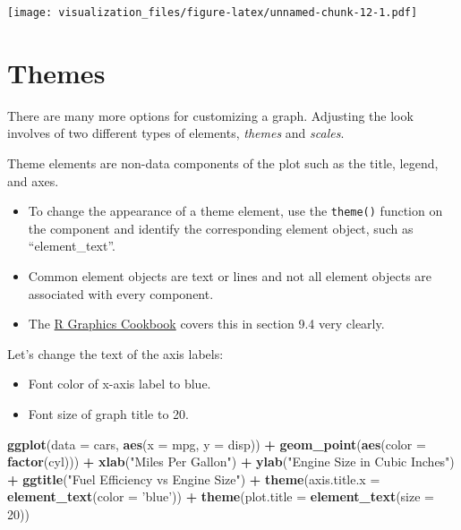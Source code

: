 \documentclass[oneside]{memoir}
\newenvironment{Shaded}{\begin{snugshade}}{\end{snugshade}}
\newcommand{\KeywordTok}[1]{\textcolor[rgb]{0.13,0.29,0.53}{\textbf{#1}}}
\newcommand{\DataTypeTok}[1]{\textcolor[rgb]{0.13,0.29,0.53}{#1}}
\newcommand{\DecValTok}[1]{\textcolor[rgb]{0.00,0.00,0.81}{#1}}
\newcommand{\StringTok}[1]{\textcolor[rgb]{0.31,0.60,0.02}{#1}}
\newcommand{\OperatorTok}[1]{\textcolor[rgb]{0.81,0.36,0.00}{\textbf{#1}}}
\newcommand{\NormalTok}[1]{#1}
\theoremstyle{definition}
\theoremstyle{definition}
\theoremstyle{definition}
\theoremstyle{remark}
\begin{document}
\texttt{[image: visualization\_files/figure-latex/unnamed-chunk-12-1.pdf]}

\section{Themes}\label{themes}

There are many more options for customizing a graph. Adjusting the look
involves of two different types of elements, \emph{themes} and
\emph{scales}.

Theme elements are non-data components of the plot such as the title,
legend, and axes.

\begin{itemize}
\item
  To change the appearance of a theme element, use the \texttt{theme()}
  function on the component and identify the corresponding element
  object, such as ``element\_text''.
\item
  Common element objects are text or lines and not all element objects
  are associated with every component.
\item
  The
  \href{http://ase.tufts.edu/bugs/guide/assets/R\%20Graphics\%20Cookbook.pdf}{R
  Graphics Cookbook} covers this in section 9.4 very clearly.
\end{itemize}

Let's change the text of the axis labels:

\begin{itemize}
\item
  Font color of x-axis label to blue.
\item
  Font size of graph title to 20.
\end{itemize}

\begin{Shaded}
\begin{Highlighting}[]
\KeywordTok{ggplot}\NormalTok{(}\DataTypeTok{data =}\NormalTok{ cars, }\KeywordTok{aes}\NormalTok{(}\DataTypeTok{x =}\NormalTok{ mpg, }\DataTypeTok{y =}\NormalTok{ disp)) }\OperatorTok{+}
\StringTok{  }\KeywordTok{geom_point}\NormalTok{(}\KeywordTok{aes}\NormalTok{(}\DataTypeTok{color =} \KeywordTok{factor}\NormalTok{(cyl))) }\OperatorTok{+}
\StringTok{  }\KeywordTok{xlab}\NormalTok{(}\StringTok{"Miles Per Gallon"}\NormalTok{) }\OperatorTok{+}
\StringTok{  }\KeywordTok{ylab}\NormalTok{(}\StringTok{"Engine Size in Cubic Inches"}\NormalTok{) }\OperatorTok{+}
\StringTok{  }\KeywordTok{ggtitle}\NormalTok{(}\StringTok{"Fuel Efficiency vs Engine Size"}\NormalTok{) }\OperatorTok{+}
\StringTok{  }\KeywordTok{theme}\NormalTok{(}\DataTypeTok{axis.title.x =} \KeywordTok{element_text}\NormalTok{(}\DataTypeTok{color =} \StringTok{'blue'}\NormalTok{)) }\OperatorTok{+}
\StringTok{  }\KeywordTok{theme}\NormalTok{(}\DataTypeTok{plot.title =} \KeywordTok{element_text}\NormalTok{(}\DataTypeTok{size =} \DecValTok{20}\NormalTok{))}
\end{Highlighting}
\end{Shaded}
\end{document}

